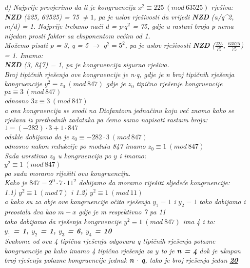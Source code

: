 \documentclass[12pt]{article}
\begin{document}
\begin{enumerate}
\begin{center}
                           \textit{d) Najprije provjerimo da li je kongruencija $x^2 \equiv 225\ (mod\ 63525)$ rješiva:\\ \textbf{NZD} (225, 63525) = 75 $\neq 1$, pa je uslov rješivosti da vrijedi \textbf{NZD} (a/q^2, m/d) = 1. Najprije trebamo naći d = p$\cdot q^2$ = 75, gdje u rastavi broja p nema nijedan prosti faktor sa eksponentom većim od 1.\\Možemo pisati p = 3, q = 5 $\rightarrow$ $q^2 = 5^2$, pa je uslov rješivosti \textbf{NZD} ($\frac{225}{75}$, $\frac{63525}{75}$) = 1. Imamo:\\\textbf{NZD} (3, 847) = 1, pa je kongruencija sigurno rješiva. \\Broj tipičnih rješenja ove kongruencije je n$\cdot$q, gdje je n broj tipičnih rješenja kongruencije $y^2 \equiv z_0\ (mod\ 847)$ gdje je $z_0$ tipično rješenje kongruencije $pz \equiv 3 \ 
                           (mod\ 847)$\\ odnosno $3z \equiv 3 \ 
                           (mod\ 847)$\\ a ova kongruencija se svodi na Diofantovu jednačinu koju već znamo kako se rješava iz prethodnih zadataka pa ćemo samo napisati rastavu broja:\\
                           $1 = (-282)\cdot3 + 1\cdot847$\\
                           odakle dobijamo da je $z_0\equiv-282\cdot3 \ (mod\ 847)$\\
                           odnosno nakon redukcije po modulu 847 imamo $z_0\equiv 1 \ (mod\ 847)$\\}
                           \vspace{0.25cm}
                           \textit{Sada uvrstimo $z_0$ u kongruenciju po $y$ i imamo:\\ $y^2\equiv1 \ (mod\ 847)$\\
                           pa sada moramo riješiti ovu kongruenciju.\\
                           Kako je $847 = 2^0 \cdot 7\cdot 11^2 $ dobijamo da moramo riješiti sljedeće kongruencije:\\
                           1.1) $y^2 \equiv 1 \ (mod\ 7)$ i 1.2) $y^2 \equiv 1 \ (mod\ 11)$\\
                           a kako su za obje ove kongruencije očita rješenja $y_1 = 1$  i $y_2 = 1$ tako dobijamo i preostala dva kao $m - x$ gdje je m respektivno 7 pa 11\\
                           tako dobijamo da rješenja kongruencije $y^2\equiv1 \ (mod\ 847)$ ima 4 i to:\\
                           \textbf{$y_1$ = 1, $y_2$ = 1, $y_3$ = 6, $y_4$ = 10}
                           \\}
                           \vspace{0.25cm}
                           \textit{Svakome od ova 4 tipična rješenja odgovara q tipičnih rješenja polazne kongruencije pa kako imamo 4 tipična rješenja za $y$ to je \textbf{n = 4} dok je ukupan broj rješenja polazne kongruencije jednak \textbf{n $\cdot$ q}, tako je broj rješenja jedan \underline{\textbf{20}}}
                           

\end{center}
\end{enumerate}
\end{document}
